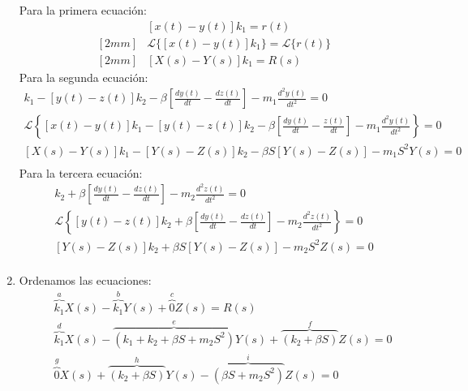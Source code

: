 \documentclass[12pt]{article}
\begin{document}
\begin{enumerate}
    Para la primera ecuaci\'on:
    \begin{eqnarray*}
      & [x(t)-y(t)]k_{1}=r(t)\\ [2mm]
      & \mathscr{L}\{[x(t)-y(t)]k_{1}\}=\mathscr{L}\{r(t)\}\\ [2mm]
      & [X(s)-Y(s)]k_{1}=R(s)
    \end{eqnarray*}
    Para la segunda ecuaci\'on:
    \begin{eqnarray*}
      [x(t)-y(t)]k_{1} - [y(t)-z(t)]k_{2} - \beta\left[\frac{dy(t)}{dt}-\frac{dz(t)}{dt}\right] - m_{1}\frac{d^{2}y(t)}{dt^{2}} = 0 \\[3mm]
      \mathscr{L}\left\{[x(t)-y(t)]k_{1} - [y(t)-z(t)]k_{2} - \beta\left[\frac{dy(t)}{dt}-\frac{z(t)}{dt}\right] - m_{1}\frac{d^{2}y(t)}{dt^{2}}\right\} = 0 \\[3mm]
      [X(s)-Y(s)]k_{1} - [Y(s)-Z(s)]k_{2} - \beta S[Y(s)-Z(s)] - m_{1}S^{2}Y(s) = 0 \\[3mm]
    \end{eqnarray*}
    Para la tercera ecuaci\'on:
    \begin{eqnarray*}
      [y(t)-z(t)]k_{2} + \beta\left[\frac{dy(t)}{dt}-\frac{dz(t)}{dt} \right] - m_{2}\frac{d^{2}z(t)}{dt^{2}} = 0 \\[2mm]
      \mathscr{L}\left\{[y(t)-z(t)]k_{2} + \beta\left[\frac{dy(t)}{dt}-\frac{dz(t)}{dt} \right] - m_{2}\frac{d^{2}z(t)}{dt^{2}}\right\} = 0 \\[2mm]
      [Y(s)-Z(s)]k_{2} + \beta S[Y(s)-Z(s)] - m_{2}S^{2}Z(s) = 0 \\[2mm]
    \end{eqnarray*}

  \item Ordenamos las ecuaciones:
    \begin{eqnarray}
      &&\overbrace{k_{1}}^{a}X(s) - \overbrace{k_{1}}^{b}Y(s) + \overbrace{0}^{c}Z(s) = R(s)\\
      &&\overbrace{k_{1}}^{d}X(s) - \overbrace{(k_{1}+k_{2}+\beta S + m_{2}S^{2})}^{e}Y(s) + \overbrace{(k_{2}+\beta S)}^{f}Z(s) = 0\\
      &&\overbrace{0}^{g}X(s) + \overbrace{(k_{2} + \beta S)}^{h}Y(s) - \overbrace{(\beta S + m_{2}S^{2})}^{i}Z(s) = 0
    \end{eqnarray}


\end{enumerate}
\end{document}
